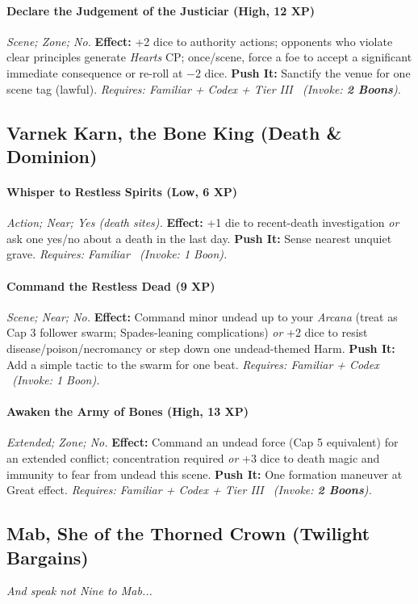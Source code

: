 \documentclass[12pt,twoside]{book}
\begin{document}
\paragraph{Declare the Judgement of the Justiciar (High, 12 XP)} \emph{Scene; Zone; No.}
\textbf{Effect:} +2 dice to authority actions; opponents who violate clear principles generate \emph{Hearts} CP; once/scene, force a foe to accept a significant immediate consequence or re-roll at −2 dice.
\textbf{Push It:} Sanctify the venue for one scene tag (lawful).
\emph{Requires: Familiar + Codex + Tier III \ (\textit{Invoke:} \textbf{2 Boons}).}

\subsection{Varnek Karn, the Bone King (Death \& Dominion)}
\paragraph{Whisper to Restless Spirits (Low, 6 XP)} \emph{Action; Near; Yes (death sites).}
\textbf{Effect:} +1 die to recent-death investigation \emph{or} ask one yes/no about a death in the last day.
\textbf{Push It:} Sense nearest unquiet grave.
\emph{Requires: Familiar \ (\textit{Invoke:} 1 Boon).}
\paragraph{Command the Restless Dead (9 XP)} \emph{Scene; Near; No.}
\textbf{Effect:} Command minor undead up to your \emph{Arcana} (treat as Cap 3 follower swarm; Spades-leaning complications) \emph{or} +2 dice to resist disease/poison/necromancy or step down one undead-themed Harm.
\textbf{Push It:} Add a simple tactic to the swarm for one beat.
\emph{Requires: Familiar + Codex \ (\textit{Invoke:} 1 Boon).}
\paragraph{Awaken the Army of Bones (High, 13 XP)} \emph{Extended; Zone; No.}
\textbf{Effect:} Command an undead force (Cap 5 equivalent) for an extended conflict; concentration required \emph{or} +3 dice to death magic and immunity to fear from undead this scene.
\textbf{Push It:} One formation maneuver at Great effect.
\emph{Requires: Familiar + Codex + Tier III \ (\textit{Invoke:} \textbf{2 Boons}).}

\subsection{Mab, She of the Thorned Crown (Twilight Bargains)}
\textit{And speak not Nine to Mab...}
\end{document}
